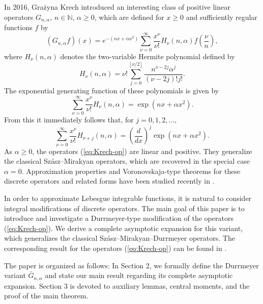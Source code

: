 \documentclass[11pt,a4paper]{article}
\begin{document}
In 2016, Gra\.{z}yna Krech \cite{Krech2016} introduced an interesting class
of positive linear operators $G_{n,\alpha }$, $n\in \mathbb{N}$, $\alpha
\geq 0$, which are defined for $x\geq 0$ and sufficiently regular functions $%
f$ by 
\begin{equation}
\left( G_{n,\alpha }f\right) \left( x\right) =e^{-\left( nx+\alpha
x^{2}\right) }\sum_{\nu =0}^{\infty }\frac{x^{\nu }}{\nu !}H_{\nu }\left(
n,\alpha \right) f\left( \frac{\nu }{n}\right) ,  \label{eq:Krech-op}
\end{equation}%
where $H_{\nu }(n,\alpha )$ denotes the two-variable Hermite polynomial
defined by 
\begin{equation*}
H_{\nu }\left( n,\alpha \right) =\nu !\sum_{j=0}^{\left\lfloor \nu
/2\right\rfloor }\frac{n^{\nu -2j}\alpha ^{j}}{\left( \nu -2j\right) !j!}.
\end{equation*}%
The exponential generating function of these polynomials is given by 
\begin{equation*}
\sum_{\nu =0}^{\infty }\frac{x^{\nu }}{\nu !}H_{\nu }\left( n,\alpha \right)
=\exp \left( nx+\alpha x^{2}\right) .
\end{equation*}%
From this it immediately follows that, for $j=0,1,2,\ldots $, 
\begin{equation}
\sum_{\nu =0}^{\infty }\frac{x^{\nu }}{\nu !}H_{\nu +j}\left( n,\alpha
\right) =\left( \frac{d}{dx}\right) ^{j}\exp \left( nx+\alpha x^{2}\right) .
\label{GF}
\end{equation}%
As $\alpha \geq 0$, the operators (\ref{eq:Krech-op}) are linear and
positive. They generalize the classical Sz\'{a}sz--Mirakyan operators, which
are recovered in the special case $\alpha =0$. Approximation properties and
Voronovskaja-type theorems for these discrete operators and related forms
have been studied recently in \cite{AbelBraha2025, Gupta2026}.

In order to approximate Lebesgue integrable functions, it is natural to
consider integral modifications of discrete operators. The main goal of this
paper is to introduce and investigate a Durrmeyer-type modification of the
operators (\ref{eq:Krech-op}). We derive a complete asymptotic expansion for
this variant, which generalizes the classical Sz\'{a}sz--Mirakyan--Durrmeyer
operators. The corresponding result for the operators (\ref{eq:Krech-op})
can be found in \cite[Theorem 2.1]{AbelBraha2025}.

The paper is organized as follows: In Section 2, we formally define the
Durrmeyer variant $\bar{G}_{n,\alpha }$ and state our main result regarding
its complete asymptotic expansion. Section 3 is devoted to auxiliary lemmas,
central moments, and the proof of the main theorem.
\end{document}
